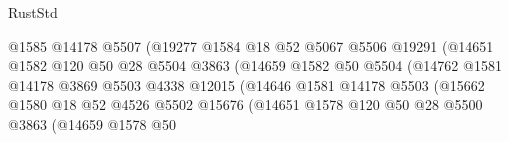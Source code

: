 \begin{lexlean}{RustStd}
\begin{coremodule}
                                        @1585
                                        @14178
                                        @5507
                                        (@19277
                                          @1584
                                          @18
                                          @52
                                          @5067
                                          @5506
                                          @19291
                                          (@14651
                                            @1582
                                            @120
                                            @50
                                            @28
                                            @5504
                                            @3863
                                            (@14659
                                              @1582
                                              @50
                                              @5504
                                              (@14762
                                                @1581
                                                @14178
                                                @3869
                                                @5503
                                                @4338
                                                @12015
                                                (@14646
                                                  @1581
                                                  @14178
                                                  @5503
                                                  (@15662
                                                    @1580
                                                    @18
                                                    @52
                                                    @4526
                                                    @5502
                                                    @15676
                                                    (@14651
                                                      @1578
                                                      @120
                                                      @50
                                                      @28
                                                      @5500
                                                      @3863
                                                      (@14659
                                                        @1578
                                                        @50

\end{coremodule}
\end{lexlean}
